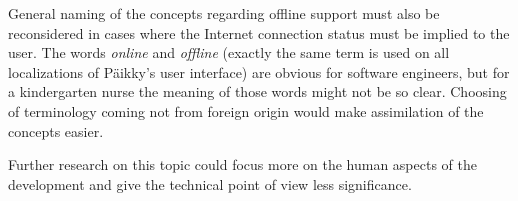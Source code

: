 General naming of the concepts regarding offline support must also be reconsidered in cases where the Internet connection status must be implied to the user. The words \textit{online} and \textit{offline} (exactly the same term is used on all localizations of Päikky's user interface) are obvious for software engineers, but for a kindergarten nurse the meaning of those words might not be so clear. Choosing of terminology coming not from foreign origin would make assimilation of the concepts easier.

Further research on this topic could focus more on the human aspects of the development and give the technical point of view less significance.


















